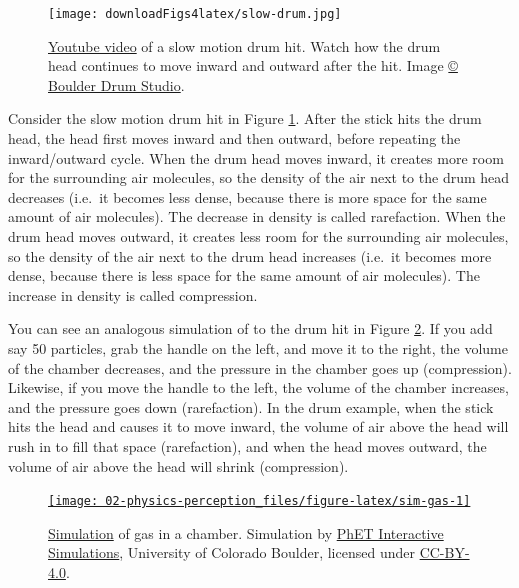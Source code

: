 \documentclass[
]{book}
\begin{document}
\begin{figure}
\centering
\texttt{[image: downloadFigs4latex/slow-drum.jpg]}
\caption{\label{fig:slow-drum}\href{https://www.youtube.com/watch?v=tM8WyhB6zYo}{Youtube video} of a slow motion drum hit. Watch how the drum head continues to move inward and outward after the hit. Image \href{https://www.youtube.com/channel/UCRZIyRiTD427A9dw3CBM4Fg}{© Boulder Drum Studio}.}
\end{figure}

Consider the slow motion drum hit in Figure \ref{fig:slow-drum}.
After the stick hits the drum head, the head first moves inward and then outward, before repeating the inward/outward cycle.
When the drum head moves inward, it creates more room for the surrounding air molecules, so the density of the air next to the drum head decreases (i.e.~it becomes less dense, because there is more space for the same amount of air molecules).
The decrease in density is called rarefaction.
When the drum head moves outward, it creates less room for the surrounding air molecules, so the density of the air next to the drum head increases (i.e.~it becomes more dense, because there is less space for the same amount of air molecules).
The increase in density is called compression.

You can see an analogous simulation of to the drum hit in Figure \ref{fig:sim-gas}.
If you add say 50 particles, grab the handle on the left, and move it to the right, the volume of the chamber decreases, and the pressure in the chamber goes up (compression).
Likewise, if you move the handle to the left, the volume of the chamber increases, and the pressure goes down (rarefaction).
In the drum example, when the stick hits the head and causes it to move inward, the volume of air above the head will rush in to fill that space (rarefaction), and when the head moves outward, the volume of air above the head will shrink (compression).



\begin{figure}
\href{https://phet.colorado.edu/sims/html/gas-properties/latest/gas-properties_en.html?screens=2}{\texttt{[image: 02-physics-perception\_files/figure-latex/sim-gas-1]} }\caption{\href{https://phet.colorado.edu/sims/html/gas-properties/latest/gas-properties_en.html?screens=2}{Simulation} of gas in a chamber. Simulation by \href{https://phet.colorado.edu/}{PhET Interactive Simulations}, University of Colorado Boulder, licensed under \href{https://creativecommons.org/licenses/by/4.0/}{CC-BY-4.0}.}\label{fig:sim-gas}
\end{figure}
\end{document}
